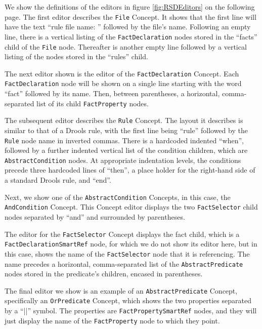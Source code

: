 We show the definitions of the editors in figure \ref{fig:RSDEditors} on the following page. 
The first editor describes the \texttt{File} Concept. 
It shows that the first line will have the text ``rule file name: '' followed by the file's name.
Following an empty line, there is a vertical listing of the \texttt{FactDeclaration} nodes stored in the ``facts'' child of the \texttt{File} node.
Thereafter is another empty line followed by a vertical listing of the  nodes stored in the ``rules'' child.

The next editor shown is the editor of the \texttt{FactDeclaration} Concept.
Each \texttt{FactDeclaration} node will be shown on a single line starting with the word ``fact'' followed by its name.
Then, between parentheses, a horizontal, comma-separated list of its child \texttt{FactProperty} nodes.

The subsequent editor describes the \texttt{Rule} Concept. 
The layout it describes is similar to that of a Drools rule, with the first line being ``rule'' followed by the \texttt{Rule} node name in inverted commas.
There is a hardcoded indented ``when'', followed by a further indented vertical list of the condition children, which are \texttt{AbstractCondition} nodes.
At appropriate indentation levels, the conditions precede three hardcoded lines of ``then'', a place holder for the right-hand side of a standard Drools rule, and ``end''.

Next, we show one of the \texttt{AbstractCondition} Concepts, in this case, the \texttt{AndCondition} Concept.
This Concept editor displays the two \texttt{FactSelector} child nodes separated by ``and'' and surrounded by parentheses.

The editor for the \texttt{FactSelector} Concept displays the fact child, which is a \texttt{FactDeclarationSmartRef} node, for which we do not show its editor here, but in this case, shows the name of the \texttt{FactSelector} node that it is referencing.
The name precedes a horizontal, comma-separated list of the \texttt{AbstractPredicate} nodes stored in the predicate's children, encased in parentheses.

The final editor we show is an example of an \texttt{AbstractPredicate} Concept, specifically an \texttt{OrPredicate} Concept, which shows the two properties separated by a ``||'' symbol.
The properties are \texttt{FactPropertySmartRef} nodes, and they will just display the name of the \texttt{FactProperty} node to which they point.

